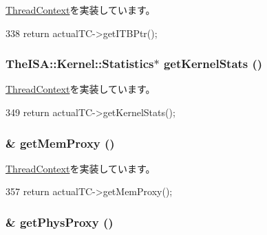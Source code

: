 \hyperlink{classThreadContext_aaae22e0dcf2f312619915bbf34509ba4}{ThreadContext}を実装しています。


\begin{DoxyCode}
338 { return actualTC->getITBPtr(); }
\end{DoxyCode}
\hypertarget{classProxyThreadContext_a3faa5e314c06241296ab582bb891a06a}{
\subsubsection[{getKernelStats}]{\setlength{\rightskip}{0pt plus 5cm}TheISA::Kernel::Statistics$\ast$ getKernelStats ()}}
\label{classProxyThreadContext_a3faa5e314c06241296ab582bb891a06a}


\hyperlink{classThreadContext_a85141770510cf256c27f10adece17ed5}{ThreadContext}を実装しています。


\begin{DoxyCode}
349     { return actualTC->getKernelStats(); }
\end{DoxyCode}
\hypertarget{classProxyThreadContext_ab07f5af63c9d22e504dfe620c0a07228}{
\subsubsection[{getMemProxy}]{\& getMemProxy ()}}
\label{classProxyThreadContext_ab07f5af63c9d22e504dfe620c0a07228}


\hyperlink{classThreadContext_a840e8764d04f2a3fb061c56738f3a874}{ThreadContext}を実装しています。


\begin{DoxyCode}
357 { return actualTC->getMemProxy(); }
\end{DoxyCode}
\hypertarget{classProxyThreadContext_a01ed2104c846a24a0e18594d3a2f7de9}{
\subsubsection[{getPhysProxy}]{\& getPhysProxy ()}}
\label{classProxyThreadContext_a01ed2104c846a24a0e18594d3a2f7de9}


